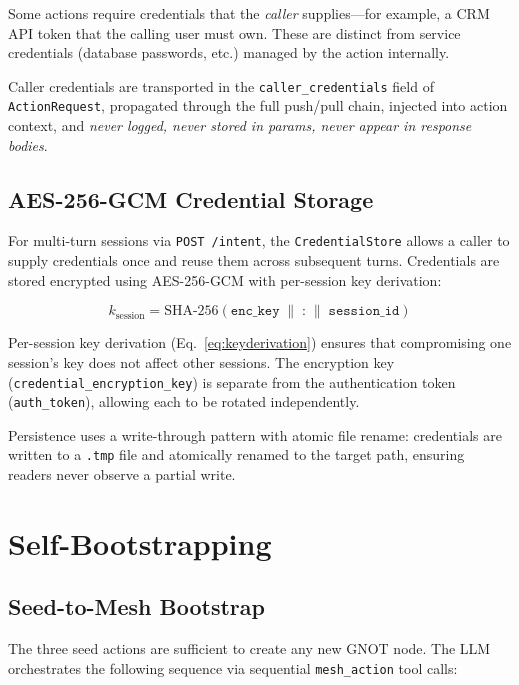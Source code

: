 \documentclass[10pt,twocolumn]{article}
\begin{document}
Some actions require credentials that the \emph{caller} supplies---for
example, a CRM API token that the calling user must own. These are
distinct from service credentials (database passwords, etc.) managed by
the action internally.

Caller credentials are transported in the \texttt{caller\_credentials}
field of \texttt{ActionRequest}, propagated through the full push/pull
chain, injected into action context, and \emph{never logged, never
stored in params, never appear in response bodies}.

\subsection{AES-256-GCM Credential Storage}

For multi-turn sessions via \texttt{POST /intent}, the
\texttt{CredentialStore} allows a caller to supply credentials once and
reuse them across subsequent turns. Credentials are stored encrypted
using AES-256-GCM with per-session key derivation:

\begin{equation}
k_{\text{session}} = \text{SHA-256}(\texttt{enc\_key} \;\|\; \texttt{:} \;\|\; \texttt{session\_id})
\label{eq:keyderivation}
\end{equation}

Per-session key derivation (Eq.~\ref{eq:keyderivation}) ensures that
compromising one session's key does not affect other sessions. The
encryption key (\texttt{credential\_encryption\_key}) is separate from
the authentication token (\texttt{auth\_token}), allowing each to be
rotated independently.

Persistence uses a write-through pattern with atomic file rename:
credentials are written to a \texttt{.tmp} file and atomically renamed
to the target path, ensuring readers never observe a partial write.

\section{Self-Bootstrapping}
\label{sec:bootstrap}

\subsection{Seed-to-Mesh Bootstrap}

The three seed actions are sufficient to create any new GNOT node. The
LLM orchestrates the following sequence via sequential \texttt{mesh\_action}
tool calls:
\end{document}
